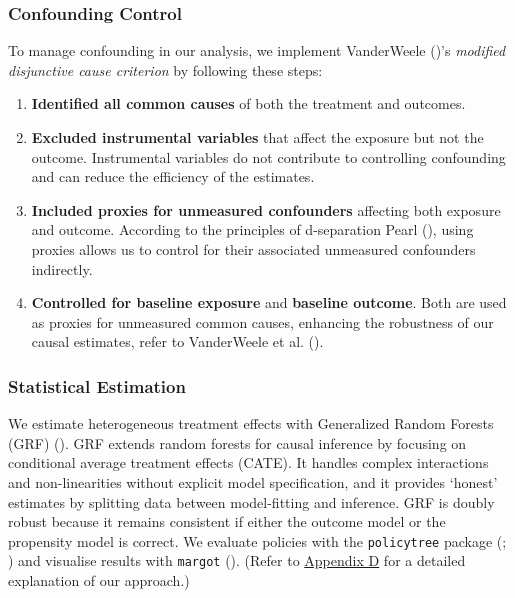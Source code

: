 \documentclass[
  single column]{article}
\providecommand{\tightlist}{%
  \setlength{\itemsep}{0pt}\setlength{\parskip}{0pt}}
\begin{document}
\subsubsection{Confounding Control}\label{confounding-control}

To manage confounding in our analysis, we implement VanderWeele
()'s \emph{modified disjunctive
cause criterion} by following these steps:

\begin{enumerate}
\def\labelenumi{\arabic{enumi}.}
\tightlist
\item
  \textbf{Identified all common causes} of both the treatment and
  outcomes.
\item
  \textbf{Excluded instrumental variables} that affect the exposure but
  not the outcome. Instrumental variables do not contribute to
  controlling confounding and can reduce the efficiency of the
  estimates.
\item
  \textbf{Included proxies for unmeasured confounders} affecting both
  exposure and outcome. According to the principles of d-separation
  Pearl (), using proxies allows us to
  control for their associated unmeasured confounders indirectly.
\item
  \textbf{Controlled for baseline exposure} and \textbf{baseline
  outcome}. Both are used as proxies for unmeasured common causes,
  enhancing the robustness of our causal estimates, refer to VanderWeele
  et al. ().
\end{enumerate}

\subsubsection{Statistical Estimation}\label{statistical-estimation}

We estimate heterogeneous treatment effects with Generalized Random
Forests (GRF) (). GRF
extends random forests for causal inference by focusing on conditional
average treatment effects (CATE). It handles complex interactions and
non-linearities without explicit model specification, and it provides
`honest' estimates by splitting data between model-fitting and
inference. GRF is doubly robust because it remains consistent if either
the outcome model or the propensity model is correct. We evaluate
policies with the \texttt{policytree} package
(; )
and visualise results with \texttt{margot}
(). (Refer to
\hyperref[appendix-explain-grf]{Appendix D} for a detailed explanation
of our approach.)
\end{document}
